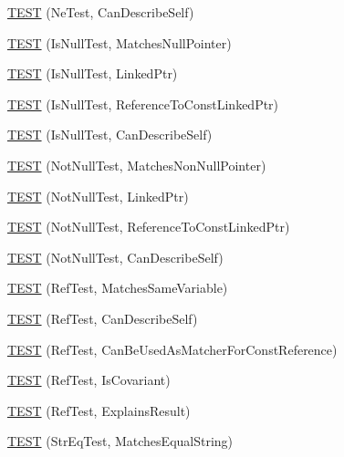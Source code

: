 \begin{DoxyCompactItemize}
\hyperlink{namespacetesting_1_1gmock__matchers__test_a8a743510a5256803d75c2d7735ec515a}{T\+E\+ST} (Ne\+Test, Can\+Describe\+Self)
\item 
\hyperlink{namespacetesting_1_1gmock__matchers__test_ae1c2971c161e051bf52b86b62c51bb95}{T\+E\+ST} (Is\+Null\+Test, Matches\+Null\+Pointer)
\item 
\hyperlink{namespacetesting_1_1gmock__matchers__test_a0b1655e1640b7da6e1e7cc35074d9274}{T\+E\+ST} (Is\+Null\+Test, Linked\+Ptr)
\item 
\hyperlink{namespacetesting_1_1gmock__matchers__test_afaaf0776096c0ad62de8236ab1b774d7}{T\+E\+ST} (Is\+Null\+Test, Reference\+To\+Const\+Linked\+Ptr)
\item 
\hyperlink{namespacetesting_1_1gmock__matchers__test_a5ba91e0b79fcc0b17b1c1e373e741c38}{T\+E\+ST} (Is\+Null\+Test, Can\+Describe\+Self)
\item 
\hyperlink{namespacetesting_1_1gmock__matchers__test_a694ea33511eab7822b88d8e74b388534}{T\+E\+ST} (Not\+Null\+Test, Matches\+Non\+Null\+Pointer)
\item 
\hyperlink{namespacetesting_1_1gmock__matchers__test_aec956599ef91df968fec972247c7a28a}{T\+E\+ST} (Not\+Null\+Test, Linked\+Ptr)
\item 
\hyperlink{namespacetesting_1_1gmock__matchers__test_a9e9560feb52f60475f653c15cc7466aa}{T\+E\+ST} (Not\+Null\+Test, Reference\+To\+Const\+Linked\+Ptr)
\item 
\hyperlink{namespacetesting_1_1gmock__matchers__test_a68da7653e6a480c60a3a03fe8afb20fc}{T\+E\+ST} (Not\+Null\+Test, Can\+Describe\+Self)
\item 
\hyperlink{namespacetesting_1_1gmock__matchers__test_a199983108927dadee9bd2e03ddd6057d}{T\+E\+ST} (Ref\+Test, Matches\+Same\+Variable)
\item 
\hyperlink{namespacetesting_1_1gmock__matchers__test_ad8fc5a82cbb4b5b8147798be06d7059b}{T\+E\+ST} (Ref\+Test, Can\+Describe\+Self)
\item 
\hyperlink{namespacetesting_1_1gmock__matchers__test_af1e64d057f2c46cc17f1c96a075cde6b}{T\+E\+ST} (Ref\+Test, Can\+Be\+Used\+As\+Matcher\+For\+Const\+Reference)
\item 
\hyperlink{namespacetesting_1_1gmock__matchers__test_a03b45cf0f65f33208ac378b8603ff67a}{T\+E\+ST} (Ref\+Test, Is\+Covariant)
\item 
\hyperlink{namespacetesting_1_1gmock__matchers__test_ab73595bcf8dd511b519b640248136ccd}{T\+E\+ST} (Ref\+Test, Explains\+Result)
\item 
\hyperlink{namespacetesting_1_1gmock__matchers__test_a5956b46686ad29d2d29b313bce9eba8a}{T\+E\+ST} (Str\+Eq\+Test, Matches\+Equal\+String)

\end{DoxyCompactItemize}
